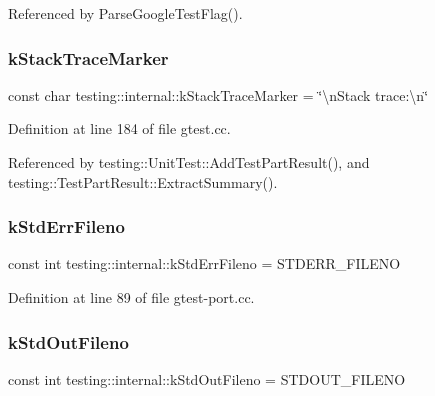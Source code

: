 Referenced by Parse\+Google\+Test\+Flag().

\mbox{\label{namespacetesting_1_1internal_abb38528ca6a45df265b19f5ccb3d16d9}} 
\subsubsection{\texorpdfstring{k\+Stack\+Trace\+Marker}{kStackTraceMarker}}
{\footnotesize\ttfamily const char testing\+::internal\+::k\+Stack\+Trace\+Marker = \char`\"{}\textbackslash{}n\+Stack trace\+:\textbackslash{}n\char`\"{}}



Definition at line 184 of file gtest.\+cc.



Referenced by testing\+::\+Unit\+Test\+::\+Add\+Test\+Part\+Result(), and testing\+::\+Test\+Part\+Result\+::\+Extract\+Summary().

\mbox{\label{namespacetesting_1_1internal_a747eccfdbdee3ff8af3bedc476a57c85}} 
\subsubsection{\texorpdfstring{k\+Std\+Err\+Fileno}{kStdErrFileno}}
{\footnotesize\ttfamily const int testing\+::internal\+::k\+Std\+Err\+Fileno = S\+T\+D\+E\+R\+R\+\_\+\+F\+I\+L\+E\+NO}



Definition at line 89 of file gtest-\/port.\+cc.

\mbox{\label{namespacetesting_1_1internal_a24f0a3d50cac54a9132f4828ec9b96d9}} 
\subsubsection{\texorpdfstring{k\+Std\+Out\+Fileno}{kStdOutFileno}}
{\footnotesize\ttfamily const int testing\+::internal\+::k\+Std\+Out\+Fileno = S\+T\+D\+O\+U\+T\+\_\+\+F\+I\+L\+E\+NO}



